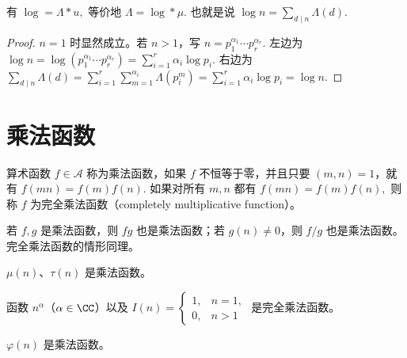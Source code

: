 \begin{example}
	有
	\(\textstyle \log=\allowbreak{}\Lambda*u,\allowbreak{}\)
	等价地
	\(\textstyle \Lambda=\allowbreak{}\log*\mu.\)
	也就是说
	\(\textstyle \log n=\allowbreak{}\sum_{d\mid\allowbreak{} n}\Lambda(d).\)
\end{example}

\begin{proof}
	$n=1$ 时显然成立。若 $n>1$，写
	\(\textstyle n=\allowbreak{}p_1^{\alpha_1}\cdots p_r^{\alpha_r}.\)
	左边为
	\(\textstyle \log n =\allowbreak{} \log\left(p_1^{\alpha_1}\cdots p_r^{\alpha_r}\right) =\allowbreak{} \sum_{i=\allowbreak{}1}^r \alpha_i\log p_i.\)
	右边为
	\(\textstyle \sum_{d\mid\allowbreak{} n}\Lambda(d) =\allowbreak{} \sum_{i=\allowbreak{}1}^r\sum_{m=\allowbreak{}1}^{\alpha_i}\Lambda(p_i^m) =\allowbreak{} \sum_{i=\allowbreak{}1}^r\alpha_i\log p_i =\allowbreak{} \log n.\)
\end{proof}

\section{乘法函数}

\begin{definition}
	算术函数 $f\in\mathcal A$ 称为乘法函数，如果 $f$ 不恒等于零，并且只要 $(m,n)=1$，就有
	\(\textstyle f(mn)=\allowbreak{}f(m)f(n).\)
	如果对所有 $m,n$ 都有
	\(\textstyle f(mn)=\allowbreak{}f(m)f(n),\allowbreak{}\)
	则称 $f$ 为完全乘法函数（completely multiplicative function）。
\end{definition}

\begin{corollary}
	若 $f,g$ 是乘法函数，则 $fg$ 也是乘法函数；若 $g(n)\neq 0$，则 $f/g$ 也是乘法函数。完全乘法函数的情形同理。
\end{corollary}

\begin{example}
	$\mu(n)$、$\tau(n)$ 是乘法函数。
\end{example}

\begin{example}
	函数 $n^\alpha$（$\alpha\in\CC$）以及
	\(\textstyle I(n)= \begin{cases} 1, & n=1,\\ 0, & n>1 \end{cases}\)
	是完全乘法函数。
\end{example}

\begin{example}
	$\varphi(n)$ 是乘法函数。
\end{example}

